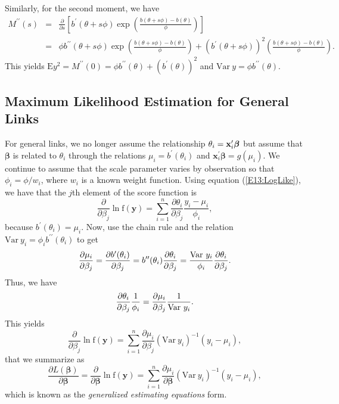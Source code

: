Similarly, for the second moment, we have
\begin{eqnarray*}
M^{\prime \prime}(s) &=&  \frac{\partial}{\partial s} \left[
b^{\prime}(\theta + s \phi) \exp \left(\frac{b(\theta + s \phi) -
b(\theta)}{\phi} \right) \right]  \\
&=& \phi b^{\prime \prime}(\theta + s \phi) \exp
\left(\frac{b(\theta + s \phi) - b(\theta)}{\phi} \right) +
(b^{\prime}(\theta + s \phi))^2 \left(\frac{b(\theta + s \phi) -
b(\theta)}{\phi} \right).
\end{eqnarray*}
This yields $\mathrm{E}y^2 = M^{\prime \prime}(0) = \phi b^{\prime
\prime}(\theta) + (b^{\prime}(\theta))^2 $ and $ \mathrm{Var}~y =
\phi b^{\prime \prime}(\theta)$.

\subsection{Maximum Likelihood Estimation for General
Links}\label{S13:MLEGeneralLinks}

For general links, we no longer assume the relationship $\theta_i=\mathbf{%
x}_i^{\mathbf{\prime }}\boldsymbol \beta$ but assume that
$\boldsymbol \beta$ is related to $\theta_i$ through the relations
$\mu _i=b^{\prime }(\theta_i)$ and $\mathbf{x}_i^{\mathbf{\prime
}}\boldsymbol \beta = g\left( \mu _i\right) $. We continue to assume
that the scale parameter varies by observation so that $\phi_i =
\phi/w_i$, where $w_i$ is a known weight function. Using equation
(\ref{E13:LogLike}), we have that the $j$th element of the score
function is
\[
\frac{\partial }{\partial \beta _{j}}\ln \mathrm{f}\left(
\mathbf{y}\right)
=\sum_{i=1}^n  \frac{\partial \theta_i}{\partial \beta _{j}}%
\frac{y_i-\mu _i}{\phi _i} ,
\]%
because $b^{\prime }(\theta_i)=\mu _i$. Now, use the chain rule and
the
relation $\mathrm{Var~}y_i=\phi _ib^{\prime \prime }(\theta_i)$ to get%
\[
\frac{\partial \mu _i}{\partial \beta _{j}}=\frac{\partial b^{\prime
}(\theta_i)}{\partial \beta _{j}}=b^{\prime \prime }(\theta_i)\frac{%
\partial \theta_i}{\partial \beta _{j}}=\frac{\mathrm{Var~}y_i}{\phi
_i}\frac{\partial \theta_i}{\partial \beta _{j}}.
\]%
Thus, we have
\[
\frac{\partial \theta_i}{\partial \beta _{j}}\frac{1}{\phi _i}=\frac{%
\partial \mu _i}{\partial \beta _{j}}\frac{1}{\mathrm{Var~}y_i}.
\]
This yields
\begin{equation*}
\frac{\partial }{\partial \beta _{j}}\ln \mathrm{f}\left(
\mathbf{y}\right) =\sum_{i=1}^n  \frac{\partial \mu _i}{\partial
\beta _{j}}\left( \mathrm{Var~}y_i\right) ^{-1}\left( y_i-\mu
_i\right)  ,
\end{equation*}
that we summarize as\setcounter{equation}{12}
\begin{equation}\label{E13:GeneralScore}
\frac{\partial  L(\boldsymbol \beta) }{\partial \boldsymbol \beta }
=  \frac{\partial }{\partial \boldsymbol \beta }\ln \mathrm{f}\left(
\mathbf{y}\right) =\sum_{i=1}^n  \frac{\partial \mu _i}{\partial
\boldsymbol \beta}\left( \mathrm{Var~}y_i\right) ^{-1}\left( y_i-\mu
_i\right) ,
\end{equation}
which is known as the \emph{generalized estimating equations}
form.

